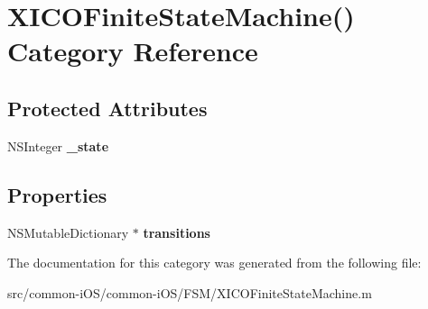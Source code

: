 \hypertarget{category_x_i_c_o_finite_state_machine_07_08}{}\section{X\+I\+C\+O\+Finite\+State\+Machine() Category Reference}
\label{category_x_i_c_o_finite_state_machine_07_08}
\subsection*{Protected Attributes}
\begin{DoxyCompactItemize}
\item 
\hypertarget{category_x_i_c_o_finite_state_machine_07_08_aa76f30e9c377e0bd806ea70b4357beba}{}\label{category_x_i_c_o_finite_state_machine_07_08_aa76f30e9c377e0bd806ea70b4357beba} 
N\+S\+Integer {\bfseries \+\_\+state}
\end{DoxyCompactItemize}
\subsection*{Properties}
\begin{DoxyCompactItemize}
\item 
\hypertarget{category_x_i_c_o_finite_state_machine_07_08_a2def607f26b71486614cb6285d33cfcf}{}\label{category_x_i_c_o_finite_state_machine_07_08_a2def607f26b71486614cb6285d33cfcf} 
N\+S\+Mutable\+Dictionary $\ast$ {\bfseries transitions}
\end{DoxyCompactItemize}


The documentation for this category was generated from the following file\+:\begin{DoxyCompactItemize}
\item 
src/common-\/i\+O\+S/common-\/i\+O\+S/\+F\+S\+M/X\+I\+C\+O\+Finite\+State\+Machine.\+m\end{DoxyCompactItemize}
